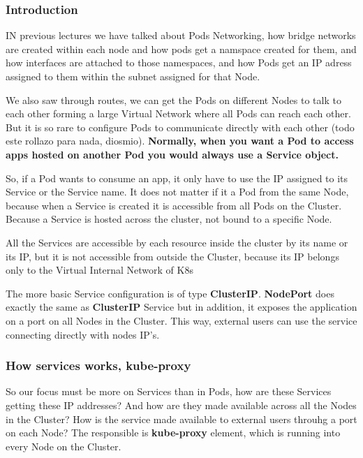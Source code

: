 \documentclass{article}
\newenvironment{blocktemplateIII}[1]{%
    \tcolorbox[beamer,%
    noparskip,breakable,
    ,colframe=Red,%
    colbacklower=LimeGreen!75!LightGreen,%
    title=#1]}%
    {\endtcolorbox}
\begin{document}
\subsubsection{Introduction}

IN previous lectures we have talked about Pods Networking, how bridge networks are created within each node and how pods get a namspace created for them, and how interfaces are attached to those namespaces, and how Pods get an IP adress assigned to them within the subnet assigned for that Node.

We also saw through routes, we can get the Pods on different Nodes to talk to each other forming a large Virtual Network where all Pods can reach each other. But it is so rare to configure Pods to communicate directly with each other (todo este rollazo para nada, diosmio). \textbf{Normally, when you want a Pod to access apps hosted on another Pod you would always use a Service object.}

So, if a Pod wants to consume an app, it only have to use the IP assigned to its Service or the Service name. It does not matter if it a Pod from the same Node, because when a Service is created it is accessible from all Pods on the Cluster. Because a Service is hosted across the cluster, not bound to a specific Node. 

\begin{blocktemplateIII}{WARNING}
All the Services are accessible by each resource inside the cluster by its name or its IP, but it is not accessible from outside the Cluster, because its IP belongs only to the Virtual Internal Network of K8s    
\end{blocktemplateIII}

The more basic Service configuration is of type \textbf{ClusterIP}. \textbf{NodePort} does exactly the same as \textbf{ClusterIP} Service but in addition, it exposes the application on a port on all Nodes in the Cluster. This way, external users can use the service connecting directly with nodes IP's.

\subsubsection{How services works, kube-proxy}

So our focus must be more on Services than in Pods, how are these Services getting these IP addresses? And how are they made available across all the Nodes in the Cluster? How is the service made available to external users throuhg a port on each Node? The responsible is \textbf{kube-proxy} element, which is running into every Node on the Cluster.
\end{document}
